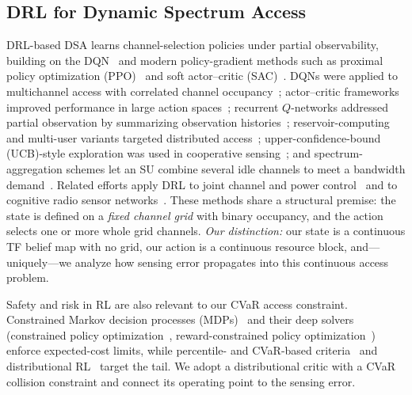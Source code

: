 \subsection{DRL for Dynamic Spectrum Access}
DRL-based DSA learns channel-selection policies under partial observability,
building on the DQN~\cite{mnih2015human} and modern
policy-gradient methods such as proximal policy optimization
(PPO)~\cite{schulman2017ppo} and soft actor--critic
(SAC)~\cite{haarnoja2018sac}. DQNs were applied to
multichannel access with correlated channel occupancy~\cite{wang2018};
actor--critic frameworks improved performance in large action
spaces~\cite{zhong2019}; recurrent $Q$-networks addressed partial observation
by summarizing observation histories~\cite{xu2020partial,hausknecht2015drqn,
xu2021deep}; reservoir-computing and multi-user variants targeted distributed
access~\cite{chang2019distributive,naparstek2018deep}; upper-confidence-bound
(UCB)-style exploration was used in cooperative sensing~\cite{zhang2019deep}; and
spectrum-aggregation schemes let an SU combine several idle channels to meet a
bandwidth demand~\cite{li2020aggregation}. Related efforts apply DRL to joint
channel and power control~\cite{tan2020deep} and to cognitive radio sensor
networks~\cite{lin2019deep}. These methods share a structural premise: the
state is defined on a \emph{fixed channel grid} with binary occupancy, and the
action selects one or more whole grid channels. \emph{Our distinction:} our
state is a continuous TF belief map with no grid, our action is a continuous
resource block, and---uniquely---we analyze how sensing error propagates into
this continuous access problem.

Safety and risk in RL are also relevant to our CVaR access constraint.
Constrained Markov decision processes (MDPs)~\cite{altman1999constrained} and their deep solvers
(constrained policy optimization~\cite{achiam2017cpo}, reward-constrained
policy optimization~\cite{tessler2019reward}) enforce expected-cost limits,
while percentile- and CVaR-based criteria~\cite{chow2017risk,rockafellar2000cvar}
and distributional RL~\cite{bellemare2017distributional,dabney2018qrdqn,
ma2020dsac} target the tail. We adopt a distributional critic with a CVaR
collision constraint and connect its operating point to the sensing error.

